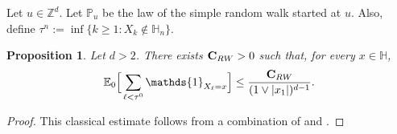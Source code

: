 \documentclass[11pt,a4paper]{article}
\numberwithin{equation}{section}
\theoremstyle{plain}
\newtheorem{Prop}[Thm]{Proposition}
\theoremstyle{definition}
\newcommand\bfC{\mathbf{C}}
\begin{document}
Let $u \in \mathbb Z^d$. Let $\mathbb P_u$ be the law of the simple random walk started at $u$. Also, define $\tau^n:=\inf\{k\geq 1: X_k\notin \mathbb H_n\}$.
\begin{Prop}\label{prop: halfspace green function estimate} Let $d>2$. There exists $\bfC_{\rm RW}>0$ such that, for every $x\in \mathbb H$,
\begin{equation}\label{eq:rw estimate 1}
	\mathbb E_0\Big[\sum_{\ell <\tau^0}\mathds{1}_{X_\ell=x}\Big]\leq \frac{\bfC_{\rm RW}}{(1\vee|x_1|)^{d-1}}.
\end{equation}
\end{Prop}
\begin{proof} This classical estimate follows from a combination of \cite[Proposition~8.1.1]{LawlerLimicRandomWalks2010} and \cite[Lemma~6.3.3]{LawlerLimicRandomWalks2010}.
%

\end{proof}
\end{document}
